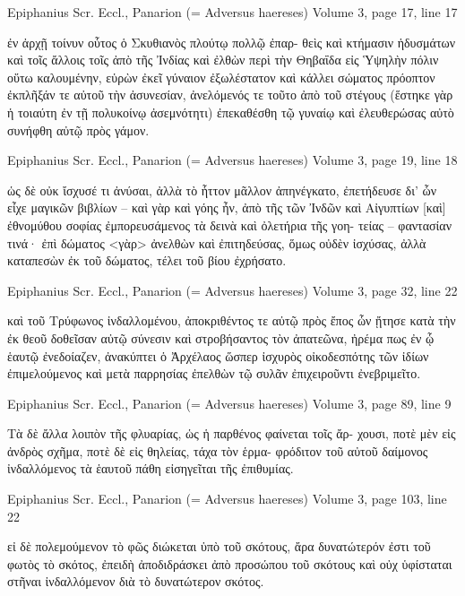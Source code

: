 \documentclass[12pt,letterpaper,twoside,final]{memoir}
\begin{document}
\begin{greek}
Epiphanius Scr. Eccl., Panarion (= Adversus haereses) 
Volume 3, page 17, line 17

              ἐν ἀρχῇ τοίνυν οὗτος ὁ Σκυθιανὸς πλούτῳ πολλῷ ἐπαρ-
θεὶς καὶ κτήμασιν ἡδυσμάτων καὶ τοῖς ἄλλοις τοῖς ἀπὸ τῆς Ἰνδίας καὶ 
ἐλθὼν περὶ τὴν Θηβαΐδα εἰς Ὑψηλὴν πόλιν οὕτω καλουμένην, εὑρὼν 
ἐκεῖ γύναιον ἐξωλέστατον καὶ κάλλει σώματος πρόοπτον ἐκπλῆξάν τε 
αὐτοῦ τὴν ἀσυνεσίαν, ἀνελόμενός τε τοῦτο ἀπὸ τοῦ στέγους (ἕστηκε 
γὰρ ἡ τοιαύτη ἐν τῇ πολυκοίνῳ ἀσεμνότητι) ἐπεκαθέσθη τῷ γυναίῳ 
καὶ ἐλευθερώσας αὐτὸ συνήφθη αὐτῷ πρὸς γάμον. 



Epiphanius Scr. Eccl., Panarion (= Adversus haereses) 
Volume 3, page 19, line 18

                                            ὡς δὲ οὐκ ἴσχυσέ τι ἀνύσαι, 
ἀλλὰ τὸ ἧττον μᾶλλον ἀπηνέγκατο, ἐπετήδευσε δι' ὧν εἶχε μαγικῶν 
βιβλίων – καὶ γὰρ καὶ γόης ἦν, ἀπὸ τῆς τῶν Ἰνδῶν καὶ Αἰγυπτίων 
[καὶ] ἐθνομύθου σοφίας ἐμπορευσάμενος τὰ δεινὰ καὶ ὀλετήρια τῆς γοη-
τείας – φαντασίαν τινά· ἐπὶ δώματος <γὰρ> ἀνελθὼν καὶ ἐπιτηδεύσας, 
ὅμως οὐδὲν ἰσχύσας, ἀλλὰ καταπεσὼν ἐκ τοῦ δώματος, τέλει τοῦ βίου 
ἐχρήσατο. 



Epiphanius Scr. Eccl., Panarion (= Adversus haereses) 
Volume 3, page 32, line 22

         καὶ τοῦ Τρύφωνος ἰνδαλλομένου, ἀποκριθέντος τε αὐτῷ πρὸς 
ἔπος ὧν ᾔτησε κατὰ τὴν ἐκ θεοῦ δοθεῖσαν αὐτῷ σύνεσιν καὶ στροβήσαντος 
τὸν ἀπατεῶνα, ἠρέμα πως ἐν ᾧ ἑαυτῷ ἐνεδοίαζεν, ἀνακύπτει ὁ Ἀρχέλαος 
ὥσπερ ἰσχυρὸς οἰκοδεσπότης τῶν ἰδίων ἐπιμελούμενος καὶ μετὰ παρρησίας 
ἐπελθὼν τῷ συλᾶν ἐπιχειροῦντι ἐνεβριμεῖτο. 



Epiphanius Scr. Eccl., Panarion (= Adversus haereses) 
Volume 3, page 89, line 9

Τὰ δὲ ἄλλα λοιπὸν τῆς φλυαρίας, ὡς ἡ παρθένος φαίνεται τοῖς ἄρ-
χουσι, ποτὲ μὲν εἰς ἀνδρὸς σχῆμα, ποτὲ δὲ εἰς θηλείας, τάχα τὸν ἑρμα-
φρόδιτον τοῦ αὐτοῦ δαίμονος ἰνδαλλόμενος τὰ ἑαυτοῦ πάθη εἰσηγεῖται 
τῆς ἐπιθυμίας. 



Epiphanius Scr. Eccl., Panarion (= Adversus haereses) 
Volume 3, page 103, line 22

                            εἰ δὲ πολεμούμενον τὸ φῶς διώκεται 
ὑπὸ τοῦ σκότους, ἄρα δυνατώτερόν ἐστι τοῦ φωτὸς τὸ σκότος, ἐπειδὴ 
ἀποδιδράσκει ἀπὸ προσώπου τοῦ σκότους καὶ οὐχ ὑφίσταται 
στῆναι ἰνδαλλόμενον διὰ τὸ δυνατώτερον σκότος. 




\end{greek}
\end{document}
